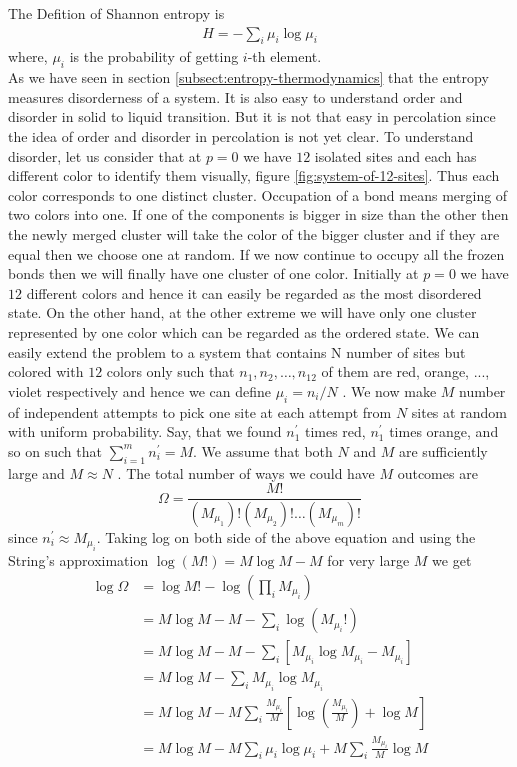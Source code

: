 	The Defition of Shannon entropy is
	\begin{align}
		H = - \sum_{i} \mu_i \log \mu_i	
		\label{def:shannon-entropy-def}
	\end{align}
	where, $\mu_i$ is the probability of getting $i$-th element.\\
	As we have seen in section \ref{subsect:entropy-thermodynamics} that the entropy measures disorderness of a system. It is also easy to understand	order and disorder in solid to liquid transition. But it is not that easy in percolation since the idea of order and disorder in percolation is not yet clear. To understand	disorder, let us consider that at $p=0$ we have $12$ isolated	sites and each has different color to identify them visually, figure \ref{fig:system-of-12-sites}. Thus each color corresponds to one distinct cluster. Occupation of a bond means merging of two colors into	one. If one of the components is bigger in size than the	other then the newly merged cluster will take the color	of the bigger cluster and if they are equal then we choose	one at random. If we now continue to occupy all the	frozen bonds then we will finally have one cluster of one	color. Initially at $p = 0$ we have $12$ different colors and	hence it can easily be regarded as the most disordered	state. On the other hand, at the other extreme we will	have only one cluster represented by one color which can	be regarded as the ordered state. We can easily extend	the problem to a system that contains N number of sites	but colored with $12$ colors only such that $n_1, n_2, \ldots, n_{12}$ of them are red, orange, ..., violet respectively and hence	we can define $\mu_i = n_i /N$ . We now make $M$ number of	independent attempts to pick one site at each attempt	from $N$ sites at random with uniform probability. Say, that we found $n_1^\prime$ times red, $n_1^\prime$ times orange, and so on	such that $\sum_{i=1}^{m} n_i^\prime = M$. We assume that both $N$ and $M$ are sufficiently large and $M \approx N$ . The total number	of ways we could have $M$ outcomes are
	\begin{equation}
		\Omega = \frac{M!}{\left(M_{\mu_1}\right)! \left(M_{\mu_2}\right)!\ldots\left(M_{\mu_m}\right)!}
	\end{equation}
	since $n_i^\prime \approx M_{\mu_i}$. Taking log on both side of the above equation and using the String's approximation $\log (M!)  = M \log M - M$ for very large $M$ we get
	\begin{align}
		\log \Omega 
		&= \log M! - \log \left(\prod_{i} M_{\mu_i}\right) \nonumber \\
		&= M\log M - M - \sum_{i} \log \left(M_{\mu_i}!\right) \nonumber \\
		&= M\log M - M - \sum_{i} \left[M_{\mu_i}\log M_{\mu_i} - M_{\mu_i}\right] \nonumber \\
		&= M\log M - \sum_{i} M_{\mu_i}\log M_{\mu_i} \nonumber \\
		&=  M\log M - M \sum_{i} \frac{M_{\mu_i}}{M} \left[\log \left(\frac{M_{\mu_i}}{M}\right) + \log M \right] \nonumber \\
		&= M\log M - M \sum_{i} \mu_i  \log \mu_i + M \sum_{i} \frac{M_{\mu_i}}{M} \log M
	\end{align}
